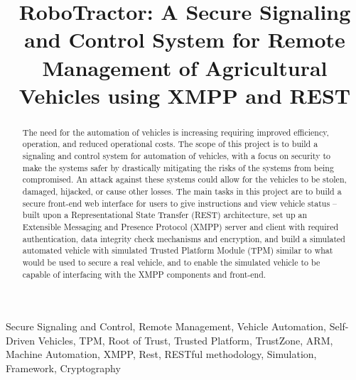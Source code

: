 \documentclass[conference,12pt]{IEEEtran}
\begin{document}
%
\title{RoboTractor: A Secure Signaling and Control System for Remote Management of Agricultural Vehicles using XMPP and REST}

\author{
\and
{}
\and
{}
}
\maketitle


\begin{abstract}
The need for the automation of vehicles is increasing requiring improved efficiency, operation, and reduced operational costs. The scope of this project is to build a signaling and control system for automation of vehicles, with a focus on security to make the systems safer by drastically mitigating the risks of the systems from being compromised. An attack against these systems could allow for the vehicles to be stolen, damaged, hijacked, or cause other losses. The main tasks in this project are to build a secure front-end web interface for users to give instructions and view vehicle status -- built upon a Representational State Transfer (REST) architecture, set up an Extensible Messaging and Presence Protocol (XMPP) server and client with required authentication, data integrity check mechanisms and encryption, and build a simulated automated vehicle with simulated Trusted Platform Module (TPM) similar to what would be used to secure a real vehicle, and to enable the simulated vehicle to be capable of interfacing with the XMPP components and front-end. 
\end{abstract}

\begin{IEEEkeywords}
    Secure Signaling and Control, Remote Management, Vehicle Automation, Self-Driven Vehicles, TPM, Root of Trust, Trusted Platform, TrustZone, ARM, Machine Automation, XMPP, Rest, RESTful methodology, Simulation, Framework, Cryptography
\end{IEEEkeywords}
\end{document}

